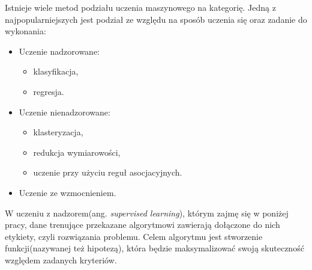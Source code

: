 Istnieje wiele metod podziału uczenia maszynowego na kategorię. Jedną z najpopularniejszych jest podział ze względu na sposób uczenia się oraz zadanie do wykonania\cite{python_ml}:
\begin{itemize}
	\item Uczenie nadzorowane:
	\begin{itemize}
		\item klasyfikacja,
		\item regresja.
	\end{itemize}
	\item Uczenie nienadzorowane:
	\begin{itemize}
		\item klasteryzacja,
		\item redukcja wymiarowości,
		\item uczenie przy użyciu reguł asocjacyjnych.
	\end{itemize}
	\item Uczenie ze wzmocnieniem.\\
\end{itemize}

W uczeniu z nadzorem(ang. \textit{supervised learning}), którym zajmę się w poniżej pracy, dane trenujące przekazane algorytmowi zawierają dołączone do nich etykiety, czyli rozwiązania problemu. Celem algorytmu jest stworzenie funkcji(nazywanej też hipotezą\cite{cichosz}), która będzie maksymalizować swoją skuteczność względem zadanych kryteriów.
\\

